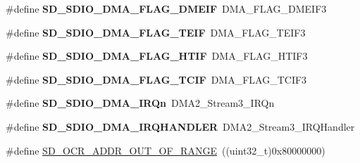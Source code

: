 \begin{DoxyCompactItemize}
\item 
\#define {\bfseries S\+D\+\_\+\+S\+D\+I\+O\+\_\+\+D\+M\+A\+\_\+\+F\+L\+A\+G\+\_\+\+D\+M\+E\+IF}~D\+M\+A\+\_\+\+F\+L\+A\+G\+\_\+\+D\+M\+E\+I\+F3\hypertarget{group__sd__card__private_gad2ec52face7ffdaf2e9b51841460e4b3}{}\label{group__sd__card__private_gad2ec52face7ffdaf2e9b51841460e4b3}

\item 
\#define {\bfseries S\+D\+\_\+\+S\+D\+I\+O\+\_\+\+D\+M\+A\+\_\+\+F\+L\+A\+G\+\_\+\+T\+E\+IF}~D\+M\+A\+\_\+\+F\+L\+A\+G\+\_\+\+T\+E\+I\+F3\hypertarget{group__sd__card__private_ga6e9973b4f4efb4592fe0f280f67ee27b}{}\label{group__sd__card__private_ga6e9973b4f4efb4592fe0f280f67ee27b}

\item 
\#define {\bfseries S\+D\+\_\+\+S\+D\+I\+O\+\_\+\+D\+M\+A\+\_\+\+F\+L\+A\+G\+\_\+\+H\+T\+IF}~D\+M\+A\+\_\+\+F\+L\+A\+G\+\_\+\+H\+T\+I\+F3\hypertarget{group__sd__card__private_ga0ce367af65ca9d6740bcc2b8345f0a31}{}\label{group__sd__card__private_ga0ce367af65ca9d6740bcc2b8345f0a31}

\item 
\#define {\bfseries S\+D\+\_\+\+S\+D\+I\+O\+\_\+\+D\+M\+A\+\_\+\+F\+L\+A\+G\+\_\+\+T\+C\+IF}~D\+M\+A\+\_\+\+F\+L\+A\+G\+\_\+\+T\+C\+I\+F3\hypertarget{group__sd__card__private_ga5e166e41de170efcc2d85edff3ddbee1}{}\label{group__sd__card__private_ga5e166e41de170efcc2d85edff3ddbee1}

\item 
\#define {\bfseries S\+D\+\_\+\+S\+D\+I\+O\+\_\+\+D\+M\+A\+\_\+\+I\+R\+Qn}~D\+M\+A2\+\_\+\+Stream3\+\_\+\+I\+R\+Qn\hypertarget{group__sd__card__private_gad126831b065276eed5e2e2260446fc2f}{}\label{group__sd__card__private_gad126831b065276eed5e2e2260446fc2f}

\item 
\#define {\bfseries S\+D\+\_\+\+S\+D\+I\+O\+\_\+\+D\+M\+A\+\_\+\+I\+R\+Q\+H\+A\+N\+D\+L\+ER}~D\+M\+A2\+\_\+\+Stream3\+\_\+\+I\+R\+Q\+Handler\hypertarget{group__sd__card__private_ga0d033e4a3e615dcdfc30596e347ad3ea}{}\label{group__sd__card__private_ga0d033e4a3e615dcdfc30596e347ad3ea}

\item 
\#define \hyperlink{group__sd__card__private_ga69314e11291e427652a4f6a3a5b1c439}{S\+D\+\_\+\+O\+C\+R\+\_\+\+A\+D\+D\+R\+\_\+\+O\+U\+T\+\_\+\+O\+F\+\_\+\+R\+A\+N\+GE}~((uint32\+\_\+t)0x80000000)\hypertarget{group__sd__card__private_ga69314e11291e427652a4f6a3a5b1c439}{}\label{group__sd__card__private_ga69314e11291e427652a4f6a3a5b1c439}


\end{DoxyCompactItemize}
